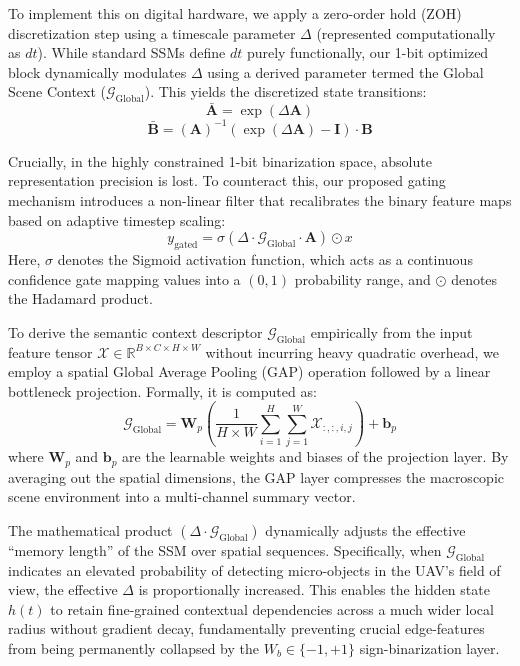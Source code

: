 \documentclass[journal]{IEEEtran}
\begin{document}
To implement this on digital hardware, we apply a zero-order hold (ZOH) discretization step using a timescale parameter $\Delta$ (represented computationally as $dt$). While standard SSMs define $dt$ purely functionally, our 1-bit optimized block dynamically modulates $\Delta$ using a derived parameter termed the Global Scene Context ($\mathcal{G}_\text{Global}$). This yields the discretized state transitions:
\begin{equation}
    \bar{\mathbf{A}} = \exp(\Delta \mathbf{A})
\end{equation}
\begin{equation}
    \bar{\mathbf{B}} = (\mathbf{A})^{-1}(\exp(\Delta \mathbf{A}) - \mathbf{I}) \cdot \mathbf{B}
\end{equation}

Crucially, in the highly constrained 1-bit binarization space, absolute representation precision is lost. To counteract this, our proposed gating mechanism introduces a non-linear filter that recalibrates the binary feature maps based on adaptive timestep scaling:
\begin{equation}
    y_{\text{gated}} = \sigma(\Delta \cdot \mathcal{G}_\text{Global} \cdot \mathbf{A}) \odot x
\end{equation}
Here, $\sigma$ denotes the Sigmoid activation function, which acts as a continuous confidence gate mapping values into a $(0, 1)$ probability range, and $\odot$ denotes the Hadamard product. 

To derive the semantic context descriptor $\mathcal{G}_\text{Global}$ empirically from the input feature tensor $\mathcal{X} \in \mathbb{R}^{B \times C \times H \times W}$ without incurring heavy quadratic overhead, we employ a spatial Global Average Pooling (GAP) operation followed by a linear bottleneck projection. Formally, it is computed as:
\begin{equation}
    \mathcal{G}_\text{Global} = \mathbf{W}_p \left( \frac{1}{H \times W} \sum_{i=1}^{H} \sum_{j=1}^{W} \mathcal{X}_{:,:,i,j} \right) + \mathbf{b}_p
\end{equation}
where $\mathbf{W}_p$ and $\mathbf{b}_p$ are the learnable weights and biases of the projection layer. By averaging out the spatial dimensions, the GAP layer compresses the macroscopic scene environment into a multi-channel summary vector.

The mathematical product $(\Delta \cdot \mathcal{G}_\text{Global})$ dynamically adjusts the effective ``memory length'' of the SSM over spatial sequences. Specifically, when $\mathcal{G}_\text{Global}$ indicates an elevated probability of detecting micro-objects in the UAV's field of view, the effective $\Delta$ is proportionally increased. This enables the hidden state $h(t)$ to retain fine-grained contextual dependencies across a much wider local radius without gradient decay, fundamentally preventing crucial edge-features from being permanently collapsed by the $W_b \in \{-1, +1\}$ sign-binarization layer.
\end{document}
